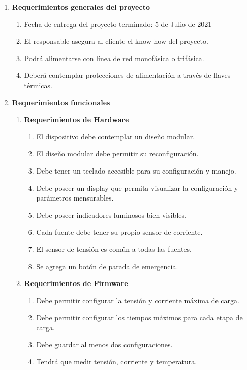 \documentclass[11pt]{charter}
\begin{document}
\begin{enumerate}
	\item \textbf{Requerimientos generales del proyecto}
	\begin{enumerate}[label*=\arabic*.]
		\item Fecha de entrega del proyecto terminado: 5 de Julio de 2021
		\item El responsable asegura al cliente el know-how del proyecto.
		\item Podrá alimentarse con línea de red monofásica o trifásica.
		\item Deberá contemplar protecciones de alimentación a través de llaves térmicas. 
	\end{enumerate}

	\item \textbf{Requerimientos funcionales}
	\begin{enumerate}[label*=\arabic*.]
		\item \textbf{Requerimientos de Hardware}
			\begin{enumerate}[label*=\arabic*.]
				\item El dispositivo debe contemplar un diseño modular.
				\item El diseño modular debe permitir su reconfiguración.
				\item Debe tener un teclado accesible para su configuración y manejo.
				\item Debe poseer un display que permita visualizar la configuración y parámetros mensurables.
				\item Debe poseer indicadores luminosos bien visibles.					
				\item Cada fuente debe tener su propio sensor de corriente.
				\item El sensor de tensión es común a todas las fuentes.
				\item Se agrega un botón de parada de emergencia.			
			\end{enumerate}
		\item \textbf{Requerimientos de Firmware}
			\begin{enumerate}[label*=\arabic*.]
				\item Debe permitir configurar la tensión y corriente máxima de carga.
				\item Debe permitir configurar los tiempos máximos para cada etapa de carga.
				\item Debe guardar al menos dos configuraciones.
				\item Tendrá que medir tensión, corriente y temperatura.

\end{enumerate}
\end{enumerate}
\end{enumerate}
\end{document}
